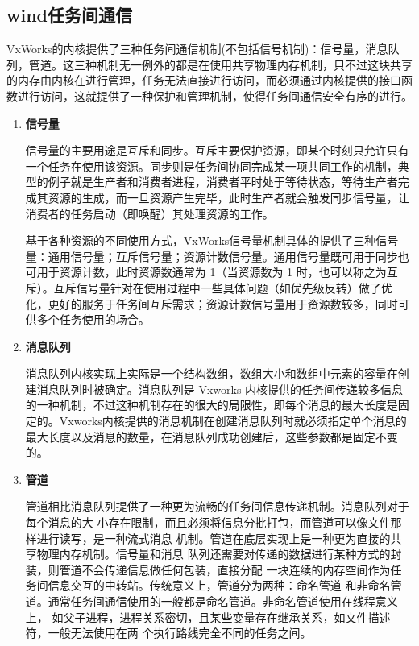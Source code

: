 \subsection{wind任务间通信}
	VxWorks的内核提供了三种任务间通信机制(不包括信号机制)：信号量，消息队列，管道。这三种机制无一例外的都是在使用共享物理内存机制，只不过这块共享的内存由内核在进行管理，任务无法直接进行访问，而必须通过内核提供的接口函数进行访问，这就提供了一种保护和管理机制，使得任务间通信安全有序的进行。

\begin{enumerate}
	\item \textbf{信号量}
	
	信号量的主要用途是互斥和同步。互斥主要保护资源，即某个时刻只允许只有一个任务在使用该资源。同步则是任务间协同完成某一项共同工作的机制，典型的例子就是生产者和消费者进程，消费者平时处于等待状态，等待生产者完成其资源的生成，而一旦资源产生完毕，此时生产者就会触发同步信号量，让消费者的任务启动（即唤醒）其处理资源的工作。
	
	基于各种资源的不同使用方式，VxWorks信号量机制具体的提供了三种信号量：通用信号量；互斥信号量；资源计数信号量。通用信号量既可用于同步也可用于资源计数，此时资源数通常为 1（当资源数为 1 时，也可以称之为互斥）。互斥信号量针对在使用过程中一些具体问题（如优先级反转）做了优化，更好的服务于任务间互斥需求；资源计数信号量用于资源数较多，同时可供多个任务使用的场合。
	\item \textbf{消息队列}
	
	消息队列内核实现上实际是一个结构数组，数组大小和数组中元素的容量在创建消息队列时被确定。消息队列是 Vxworks 内核提供的任务间传递较多信息的一种机制，不过这种机制存在的很大的局限性，即每个消息的最大长度是固定的。Vxworks内核提供的消息机制在创建消息队列时就必须指定单个消息的最大长度以及消息的数量，在消息队列成功创建后，这些参数都是固定不变的。
	
	\item \textbf{管道}
	
	管道相比消息队列提供了一种更为流畅的任务间信息传递机制。消息队列对于每个消息的大
小存在限制，而且必须将信息分批打包，而管道可以像文件那样进行读写，是一种流式消息
机制。管道在底层实现上是一种更为直接的共享物理内存机制。信号量和消息
队列还需要对传递的数据进行某种方式的封装，则管道不会传递信息做任何包装，直接分配
一块连续的内存空间作为任务间信息交互的中转站。传统意义上，管道分为两种：命名管道
和非命名管道。通常任务间通信使用的一般都是命名管道。非命名管道使用在线程意义上，
如父子进程，进程关系密切，且某些变量存在继承关系，如文件描述符，一般无法使用在两
个执行路线完全不同的任务之间。
\end{enumerate}		

